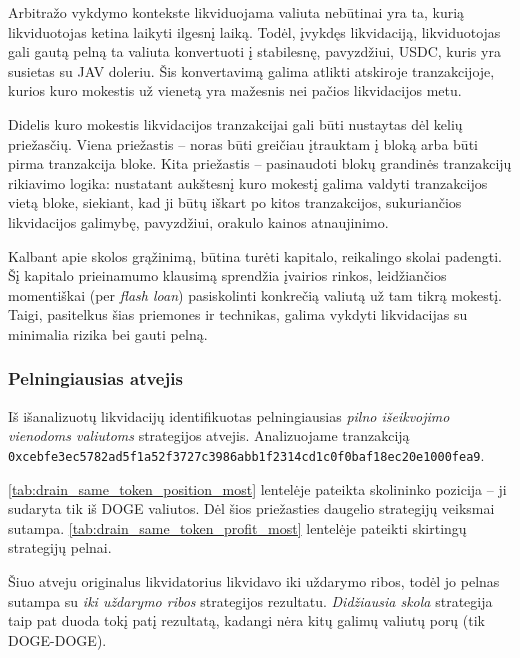 \documentclass[]{VUMIFTemplateClass}
\begin{document}
Arbitražo vykdymo kontekste likviduojama valiuta nebūtinai yra ta, kurią likviduotojas ketina laikyti ilgesnį laiką. Todėl, įvykdęs likvidaciją, likviduotojas gali gautą pelną ta valiuta konvertuoti į stabilesnę, pavyzdžiui, USDC, kuris yra susietas su JAV doleriu. Šis konvertavimą galima atlikti atskiroje tranzakcijoje, kurios kuro mokestis už vienetą yra mažesnis nei pačios likvidacijos metu.

Didelis kuro mokestis likvidacijos tranzakcijai gali būti nustaytas dėl kelių priežasčių. Viena priežastis – noras būti greičiau įtrauktam į bloką arba būti pirma tranzakcija bloke. Kita priežastis – pasinaudoti blokų grandinės tranzakcijų rikiavimo logika: nustatant aukštesnį kuro mokestį galima valdyti tranzakcijos vietą bloke, siekiant, kad ji būtų iškart po kitos tranzakcijos, sukuriančios likvidacijos galimybę, pavyzdžiui, orakulo kainos atnaujinimo.

Kalbant apie skolos grąžinimą, būtina turėti kapitalo, reikalingo skolai padengti. Šį kapitalo prieinamumo klausimą sprendžia įvairios rinkos, leidžiančios momentiškai (per \textit{flash loan}) pasiskolinti konkrečią valiutą už tam tikrą mokestį. Taigi, pasitelkus šias priemones ir technikas, galima vykdyti likvidacijas su minimalia rizika bei gauti pelną.

\subsubsection{Pelningiausias atvejis}


Iš išanalizuotų likvidacijų identifikuotas pelningiausias \textit{pilno išeikvojimo vienodoms valiutoms} strategijos atvejis. Analizuojame tranzakciją \\ \texttt{0xcebfe3ec5782ad5f1a52f3727c3986abb1f2314cd1c0f0baf18ec20e1000fea9}.

\ref{tab:drain_same_token_position_most} lentelėje pateikta skolininko pozicija – ji sudaryta tik iš DOGE valiutos. Dėl šios priežasties daugelio strategijų veiksmai sutampa. \ref{tab:drain_same_token_profit_most} lentelėje pateikti skirtingų strategijų pelnai.

Šiuo atveju originalus likvidatorius likvidavo iki uždarymo ribos, todėl jo pelnas sutampa su \textit{iki uždarymo ribos} strategijos rezultatu. \textit{Didžiausia skola} strategija taip pat duoda tokį patį rezultatą, kadangi nėra kitų galimų valiutų porų (tik DOGE-DOGE).
\end{document}
